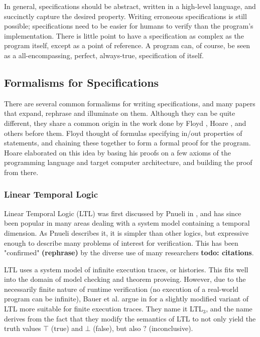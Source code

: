 \documentclass[a4paper,11pt]{kth-mag}
\newcommand{\todo}[1]{\textbf{todo: #1}}
\newcommand{\rephrase}{\textbf{(rephrase)} }
\begin{document}
In general, specifications should be abstract, written in a high-level language, and succinctly
capture the desired property. Writing erroneous specifications is still possible; specifications need
to be easier for humans to verify than the program's implementation. There is little point to have
a specification as complex as the program itself, except as a point of reference. A program can,
of course, be seen as a all-encompassing, perfect, always-true, specification of itself.



\subsection{Formalisms for Specifications}

There are several common formalisms for writing specifications, and many papers that expand,
rephrase and illuminate on them. Although they can be quite different, they share a
common origin in the work done by Floyd \cite{floyd67}, Hoare \cite{hoare69}, and others before them.
Floyd thought of formulas specifying in/out properties of statements, and chaining these together
to form a formal proof for the program. Hoare elaborated on this idea by basing his proofs on
a few axioms of the programming language and target computer architecture, and building the proof from there.

\subsubsection{Linear Temporal Logic}

Linear Temporal Logic (LTL) was first discussed by Pnueli in \cite{pnueli77}, and has since been
popular in many areas dealing with a system model containing a temporal dimension. As Pnueli
describes it, it is simpler than other logics, but expressive enough to describe many problems
of interest for verification. This has been "confirmed" \rephrase by the diverse use of
many researchers \todo{citations}.

LTL uses a system model of infinite execution traces, or histories. This fits well into the domain
of model checking and theorem proveing. However, due to the necessarily finite nature of runtime
verification (no execution of a real-world program can be infinite), Bauer et al. argue in
\cite{bauer07rvltl,bauer06monitoring} for a slightly modified variant of LTL more suitable
for finite execution traces. They name it LTL$_3$, and the name derives from the fact that they
modify the semantics of LTL to not only yield the truth values $\top$ (true) and $\bot$ (false), but also $?$ (inconclusive).
\end{document}
